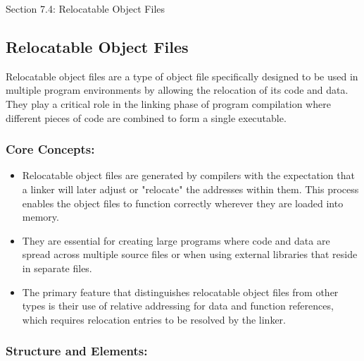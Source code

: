 \begin{notes}{Section 7.4: Relocatable Object Files}
    \subsection*{Relocatable Object Files}

    Relocatable object files are a type of object file specifically designed to be used in multiple program environments by allowing the relocation of its code and data. They play a critical role in 
    the linking phase of program compilation where different pieces of code are combined to form a single executable. \vspace*{1em}
    
    \subsubsection*{Core Concepts:}
    
    \begin{itemize}
        \item Relocatable object files are generated by compilers with the expectation that a linker will later adjust or "relocate" the addresses within them. This process enables the object files to 
        function correctly wherever they are loaded into memory.
        \item They are essential for creating large programs where code and data are spread across multiple source files or when using external libraries that reside in separate files.
        \item The primary feature that distinguishes relocatable object files from other types is their use of relative addressing for data and function references, which requires relocation entries 
        to be resolved by the linker.
    \end{itemize}
    
    \subsubsection*{Structure and Elements:}
    

\end{notes}
